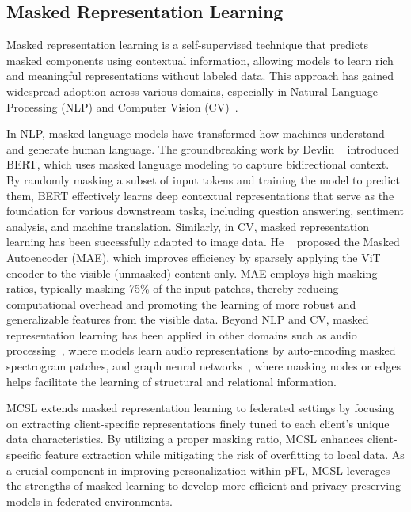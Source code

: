 \subsection{Masked Representation Learning} 
Masked representation learning is a self-supervised technique that predicts masked components using contextual information, allowing models to learn rich and meaningful representations without labeled data. This approach has gained widespread adoption across various domains, especially in Natural Language Processing (NLP) and Computer Vision (CV)~\cite{devlin2018bert,he2022masked,fang2023eva}.

In NLP, masked language models have transformed how machines understand and generate human language. The groundbreaking work by Devlin \etal~\cite{devlin2018bert} introduced BERT, which uses masked language modeling to capture bidirectional context. By randomly masking a subset of input tokens and training the model to predict them, BERT effectively learns deep contextual representations that serve as the foundation for various downstream tasks, including question answering, sentiment analysis, and machine translation. Similarly, in CV, masked representation learning has been successfully adapted to image data. He \etal~\cite{he2022masked} proposed the Masked Autoencoder (MAE), which improves efficiency by sparsely applying the ViT~\cite{dosovitskiy2020image} encoder to the visible (unmasked) content only. MAE employs high masking ratios, typically masking 75\% of the input patches, thereby reducing computational overhead and promoting the learning of more robust and generalizable features from the visible data. Beyond NLP and CV, masked representation learning has been applied in other domains such as audio processing~\cite{niizumi2022masked}, where models learn audio representations by auto-encoding masked spectrogram patches, and graph neural networks~\cite{li2023s}, where masking nodes or edges helps facilitate the learning of structural and relational information.

MCSL extends masked representation learning to federated settings by focusing on extracting client-specific representations finely tuned to each client’s unique data characteristics. By utilizing a proper masking ratio, MCSL enhances client-specific feature extraction while mitigating the risk of overfitting to local data. As a crucial component in improving personalization within pFL, MCSL leverages the strengths of masked learning to develop more efficient and privacy-preserving models in federated environments.